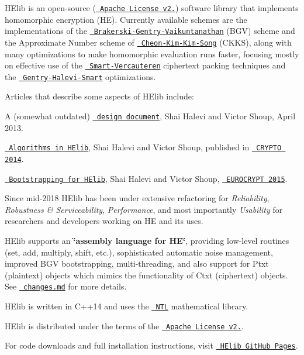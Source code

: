 H\+Elib is an open-\/source (\href{http://www.apache.org/licenses/LICENSE-2.0}{\texttt{ Apache License v2.}}) software library that implements homomorphic encryption (HE). Currently available schemes are the implementations of the \href{http://eprint.iacr.org/2011/277}{\texttt{ Brakerski-\/\+Gentry-\/\+Vaikuntanathan}} (B\+GV) scheme and the Approximate Number scheme of \href{http://eprint.iacr.org/2016/421}{\texttt{ Cheon-\/\+Kim-\/\+Kim-\/\+Song}} (C\+K\+KS), along with many optimizations to make homomorphic evaluation runs faster, focusing mostly on effective use of the \href{http://eprint.iacr.org/2011/133}{\texttt{ Smart-\/\+Vercauteren}} ciphertext packing techniques and the \href{http://eprint.iacr.org/2012/099}{\texttt{ Gentry-\/\+Halevi-\/\+Smart}} optimizations.

Articles that describe some aspects of H\+Elib include\+:


\begin{DoxyItemize}
\item A (somewhat outdated) \href{http://people.csail.mit.edu/shaih/pubs/he-library.pdf}{\texttt{ design document}}, Shai Halevi and Victor Shoup, April 2013.
\item \href{http://eprint.iacr.org/2014/106}{\texttt{ Algorithms in H\+Elib}}, Shai Halevi and Victor Shoup, published in \href{http://www.iacr.org/conferences/crypto2014/}{\texttt{ C\+R\+Y\+P\+TO 2014}}.
\item \href{http://eprint.iacr.org/2014/873}{\texttt{ Bootstrapping for H\+Elib}}, Shai Halevi and Victor Shoup, \href{https://www.cosic.esat.kuleuven.be/eurocrypt_2015/}{\texttt{ E\+U\+R\+O\+C\+R\+Y\+PT 2015}}.
\end{DoxyItemize}

Since mid-\/2018 H\+Elib has been under extensive refactoring for {\itshape Reliability}, {\itshape Robustness \& Serviceability}, {\itshape Performance}, and most importantly {\itshape Usability} for researchers and developers working on HE and its uses.

H\+Elib supports an {\bfseries{\char`\"{}assembly language for H\+E\char`\"{}}}, providing low-\/level routines (set, add, multiply, shift, etc.), sophisticated automatic noise management, improved B\+GV bootstrapping, multi-\/threading, and also support for Ptxt (plaintext) objects which mimics the functionality of Ctxt (ciphertext) objects. See \href{https://github.com/homenc/HElib/changes.md}{\texttt{ changes.\+md}} for more details.

H\+Elib is written in C++14 and uses the \href{http://www.shoup.net/ntl/}{\texttt{ N\+TL}} mathematical library.

H\+Elib is distributed under the terms of the \href{http://www.apache.org/licenses/LICENSE-2.0}{\texttt{ Apache License v2.}}. ~\newline


For code downloads and full installation instructions, visit \href{https://github.com/homenc/HElib}{\texttt{ H\+Elib Git\+Hub Pages}}. 